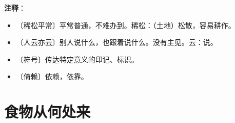 \documentclass[12pt,UTF-8,openany]{ctexbook}
\begin{document}
\newpage

\textbf{注释}：

\vspace{-1em}

\begin{itemize}
    \setlength\itemsep{-0.2em}
    \item 〔稀松平常〕平常普通，不难办到。稀松：（土地）松散，容易耕作。
    \item 〔人云亦云〕别人说什么，也跟着说什么。没有主见。云：说。
    \item 〔符号〕传达特定意义的印记、标识。
    \item 〔倚赖〕依赖，依靠。
\end{itemize}

\chapter{食物从何处来}
\end{document}
